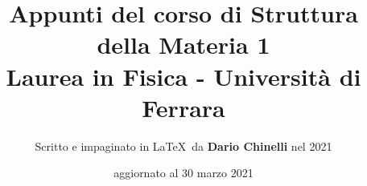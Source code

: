 \documentclass[11pt]{article}
\begin{document}
\title{\textbf{Appunti del corso di Struttura della Materia 1} \\
Laurea in Fisica - Università di Ferrara} 

\author{Scritto e impaginato in \LaTeX\ da \textbf{Dario Chinelli} nel 2021}

\date{aggiornato al 30 marzo 2021}

\maketitle

\newpage

\tableofcontents


\iffalse
    

    

    

    

    

    

    

    

    

    

    

    
\fi
    

    

    

    
\iffalse
    
    
    
    
    
    
    
\fi
\end{document}
